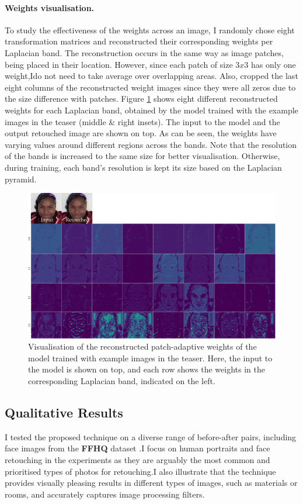 \paragraph{Weights visualisation.} To study the effectiveness of the weights across an image, I randomly chose eight transformation matrices and reconstructed their corresponding weights per Laplacian band. The reconstruction occurs in the same way as image patches, being placed in their location. However, since each patch of size $3 x 3$ has only one weight,Ido not need to take average over overlapping areas. Also, cropped the last eight columns of the reconstructed weight images since they were all zeros due to the size difference with patches. Figure \ref{fig:weight-vis} shows eight different reconstructed weights for each Laplacian band, obtained by the model trained with the example images in the teaser (middle \& right insets). The input to the model and the output retouched image are shown on top. As can be seen, the weights have varying values around different regions across the bands. Note that the resolution of the bands is increased to the same size for better visualisation. Otherwise, during training, each band’s resolution is kept its size based on the Laplacian pyramid.

\begin{figure}%
\centering
\includegraphics[width=0.8\columnwidth]{Chapters/detail-retouching-figs/weight_visualise.pdf}
    \caption{Visualisation of the reconstructed patch-adaptive weights of the model trained with example images in the teaser. Here, the input to the model is shown on top, and each row shows the weights in the corresponding Laplacian band, indicated on the left.}

\label{fig:weight-vis}
\end{figure}

\subsection{Qualitative Results}
I tested the proposed technique on a diverse range of before-after pairs, including face images from the \textbf{FFHQ} dataset \cite{karras2019style}.I focus on human portraits and face retouching in the experiments as they are arguably the most common and prioritised types of photos for retouching.I also illustrate that the technique provides visually pleasing results in different types of images, such as materials or rooms, and accurately captures image processing filters.

